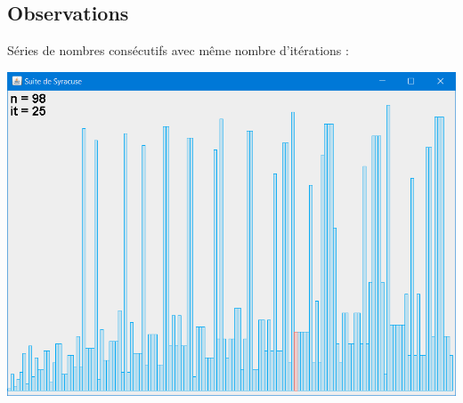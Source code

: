 \documentclass{beamer}
\begin{document}
\subsection{Observations}
\begin{frame}
Séries de nombres consécutifs avec même nombre d'itérations :
\begin{center}
\includegraphics[scale=0.5]{images/syracuse_150.PNG}
\end{center}
\end{frame}
\end{document}
